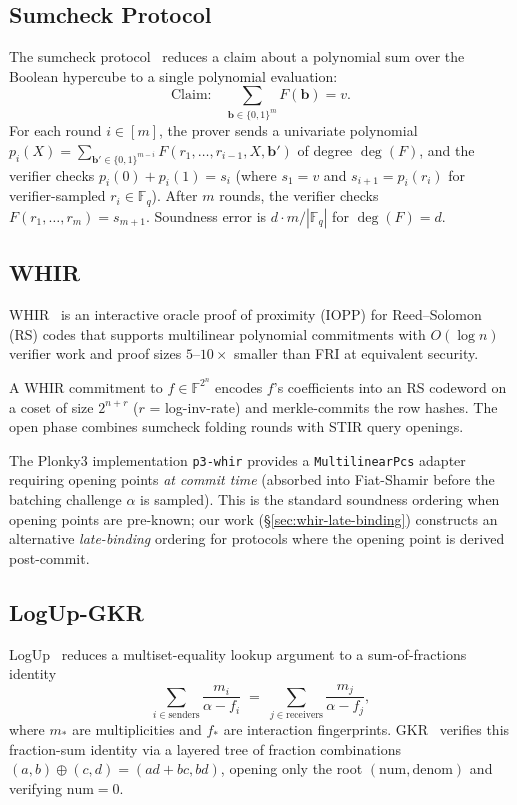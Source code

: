 \subsection{Sumcheck Protocol}

The sumcheck protocol~\cite{sumcheck} reduces a claim about a
polynomial sum over the Boolean hypercube to a single polynomial
evaluation:
\[
  \text{Claim:}\quad \sum_{\mathbf{b} \in \{0,1\}^m} F(\mathbf{b}) = v.
\]
For each round $i \in [m]$, the prover sends a univariate polynomial
$p_i(X) = \sum_{\mathbf{b}' \in \{0,1\}^{m-i}}
F(r_1, \ldots, r_{i-1}, X, \mathbf{b}')$ of degree $\deg(F)$, and
the verifier checks $p_i(0) + p_i(1) = s_i$ (where $s_1 = v$ and
$s_{i+1} = p_i(r_i)$ for verifier-sampled $r_i \in \mathbb{F}_q$).
After $m$ rounds, the verifier checks
$F(r_1, \ldots, r_m) = s_{m+1}$.  Soundness error is
$d \cdot m / |\mathbb{F}_q|$ for $\deg(F) = d$.

\subsection{WHIR}

WHIR~\cite{whir2024} is an interactive oracle proof of proximity
(IOPP) for Reed--Solomon (RS) codes that supports multilinear
polynomial commitments with $O(\log n)$ verifier work and proof
sizes $5$--$10\times$ smaller than FRI at equivalent security.

A WHIR commitment to $f \in \mathbb{F}^{2^n}$ encodes $f$'s
coefficients into an RS codeword on a coset of size $2^{n+r}$
($r$ = log-inv-rate) and merkle-commits the row hashes.  The open
phase combines sumcheck folding rounds with STIR query openings.

The Plonky3 implementation \texttt{p3-whir} provides a
\texttt{MultilinearPcs} adapter requiring opening points
\emph{at commit time} (absorbed into Fiat-Shamir before the
batching challenge $\alpha$ is sampled).  This is the standard
soundness ordering when opening points are pre-known; our
work (\S\ref{sec:whir-late-binding}) constructs an alternative
\emph{late-binding} ordering for protocols where the opening
point is derived post-commit.

\subsection{LogUp-GKR}

LogUp~\cite{logup-gkr} reduces a multiset-equality lookup argument
to a sum-of-fractions identity
\[
  \sum_{i \in \mathrm{senders}} \frac{m_i}{\alpha - f_i} \;=\;
  \sum_{j \in \mathrm{receivers}} \frac{m_j}{\alpha - f_j},
\]
where $m_*$ are multiplicities and $f_*$ are interaction
fingerprints.  GKR~\cite{logup-gkr} verifies this fraction-sum
identity via a layered tree of fraction combinations
$(a, b) \oplus (c, d) = (ad + bc, bd)$, opening only the root
$(\mathrm{num}, \mathrm{denom})$ and verifying $\mathrm{num} = 0$.

